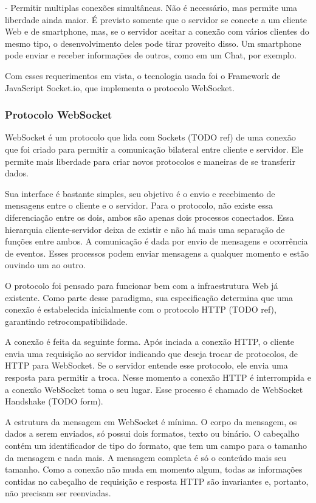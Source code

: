 \documentclass[a4paper,12pt]{article}
\begin{document}
- Permitir multiplas conexões simultâneas. Não é necessário, mas permite uma liberdade ainda maior. É previsto somente que o servidor se conecte a um cliente Web e de smartphone, mas, se o servidor aceitar a conexão com vários clientes do mesmo tipo, o desenvolvimento deles pode tirar proveito disso. Um smartphone pode enviar e receber informações de outros, como em um Chat, por exemplo.

Com esses requerimentos em vista, o tecnologia usada foi o Framework de JavaScript Socket.io, que implementa o protocolo WebSocket.


\subsubsection{Protocolo WebSocket}


WebSocket é um protocolo que lida com Sockets (TODO ref) de uma conexão que foi criado para permitir a comunicação bilateral entre cliente e servidor. Ele permite mais liberdade para criar novos protocolos e maneiras de se transferir dados.

Sua interface é bastante simples, seu objetivo é o envio e recebimento de mensagens entre o cliente e o servidor. Para o protocolo, não existe essa diferenciação entre os dois, ambos são apenas dois processos conectados. Essa hierarquia cliente-servidor deixa de existir e não há mais uma separação de funções entre ambos. A comunicação é dada por envio de mensagens e ocorrência de eventos. Esses processos podem enviar mensagens a qualquer momento e estão ouvindo um ao outro.

O protocolo foi pensado para funcionar bem com a infraestrutura Web já existente. Como parte desse paradigma, sua especificação determina que uma conexão é estabelecida inicialmente com o protocolo HTTP (TODO ref), garantindo retrocompatibilidade.

A conexão é feita da seguinte forma. Após inciada a conexão HTTP, o cliente envia uma requisição ao servidor indicando que deseja trocar de protocolos, de HTTP para WebSocket. Se o servidor entende esse protocolo, ele envia uma resposta para permitir a troca. Nesse momento a conexão HTTP é interrompida e a conexão WebSocket toma o seu lugar. Esse processo é chamado de {WebSocket Handshake} (TODO form).

A estrutura da mensagem em WebSocket é mínima. O corpo da mensagem, os dados a serem enviados, só possui dois formatos, texto ou binário. O cabeçalho contém um identificador de tipo do formato, que tem um campo para o tamanho da mensagem e nada mais. A mensagem completa é só o conteúdo mais seu tamanho. Como a conexão não muda em momento algum, todas as informações contidas no cabeçalho de requisição e resposta HTTP são invariantes e, portanto, não precisam ser reenviadas.
\end{document}
